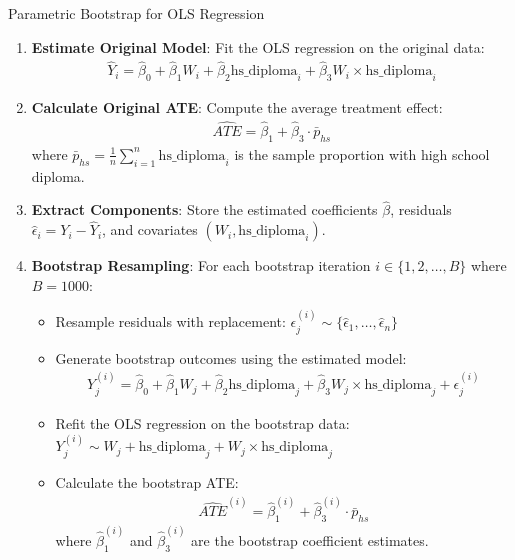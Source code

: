 \documentclass[11pt]{article}
\numberwithin{equation}{section}
\begin{document}
\begin{algorithm}
    \caption{Parametric Bootstrap for OLS Regression}
    \label{alg:parametric_bootstrap_ols}
    \begin{enumerate}
        \item \textbf{Estimate Original Model}: Fit the OLS regression on the original data:
        \begin{align}
            \hat{Y}_i = \hat{\beta}_0 + \hat{\beta}_1 W_i + \hat{\beta}_2 \text{hs\_diploma}_i + \hat{\beta}_3 W_i \times \text{hs\_diploma}_i
        \end{align}
        
        \item \textbf{Calculate Original ATE}: Compute the average treatment effect:
        \begin{align}
            \widehat{ATE} = \hat{\beta}_1 + \hat{\beta}_3 \cdot \bar{p}_{hs}
        \end{align}
        where $\bar{p}_{hs} = \frac{1}{n}\sum_{i=1}^n \text{hs\_diploma}_i$ is the sample proportion with high school diploma.
        
        \item \textbf{Extract Components}: Store the estimated coefficients $\hat{\beta}$, residuals $\hat{\epsilon}_i = Y_i - \hat{Y}_i$, and covariates $(W_i, \text{hs\_diploma}_i)$.
        
        \item \textbf{Bootstrap Resampling}: For each bootstrap iteration $i \in \{1, 2, \ldots, B\}$ where $B = 1000$:
        \begin{itemize}
            \item Resample residuals with replacement: $\epsilon^{(i)}_j \sim \{\hat{\epsilon}_1, \ldots, \hat{\epsilon}_n\}$
            \item Generate bootstrap outcomes using the estimated model:
            \begin{align}
                Y^{(i)}_j = \hat{\beta}_0 + \hat{\beta}_1 W_j + \hat{\beta}_2 \text{hs\_diploma}_j + \hat{\beta}_3 W_j \times \text{hs\_diploma}_j + \epsilon^{(i)}_j
            \end{align}
            \item Refit the OLS regression on the bootstrap data: $Y^{(i)}_j \sim W_j + \text{hs\_diploma}_j + W_j \times \text{hs\_diploma}_j$
            \item Calculate the bootstrap ATE:
            \begin{align}
                \widehat{ATE}^{(i)} = \hat{\beta}^{(i)}_1 + \hat{\beta}^{(i)}_3 \cdot \bar{p}_{hs}
            \end{align}
            where $\hat{\beta}^{(i)}_1$ and $\hat{\beta}^{(i)}_3$ are the bootstrap coefficient estimates.
        \end{itemize}
        

\end{enumerate}
\end{algorithm}
\end{document}
